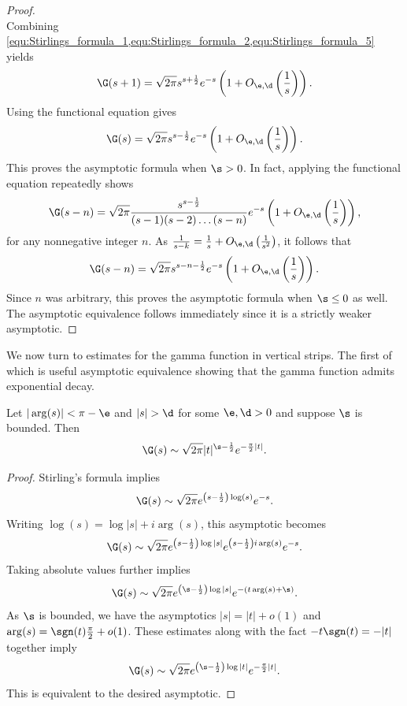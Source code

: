 \documentclass[12pt]{article}
\begin{document}
\begin{proof}
\begin{equation}
      \end{equation}
      Combining \cref{equ:Stirlings_formula_1,equ:Stirlings_formula_2,equ:Stirlings_formula_5} yields
      \[
        \G(s+1) = \sqrt{2\pi}s^{s+\frac{1}{2}}e^{-s}\left(1+O_{\e,\d}\left(\frac{1}{s}\right)\right).
      \]
      Using the functional equation gives
      \[
        \G(s) = \sqrt{2\pi}s^{s-\frac{1}{2}}e^{-s}\left(1+O_{\e,\d}\left(\frac{1}{s}\right)\right).
      \]
      This proves the asymptotic formula when \(\s > 0\). In fact, applying the functional equation repeatedly shows
      \[
        \G(s-n) = \sqrt{2\pi}\frac{s^{s-\frac{1}{2}}}{(s-1)(s-2) \ldots (s-n)}e^{-s}\left(1+O_{\e,\d}\left(\frac{1}{s}\right)\right),
      \]
      for any nonnegative integer \(n\). As \(\frac{1}{s-k} = \frac{1}{s}+O_{\e,\d}\left(\frac{1}{s^{2}}\right)\), it follows that
      \[
        \G(s-n) = \sqrt{2\pi}s^{s-n-\frac{1}{2}}e^{-s}\left(1+O_{\e,\d}\left(\frac{1}{s}\right)\right).
      \]
      Since \(n\) was arbitrary, this proves the asymptotic formula when \(\s \le 0\) as well. The asymptotic equivalence follows immediately since it is a strictly weaker asymptotic.
    \end{proof}

    We now turn to estimates for the gamma function in vertical strips. The first of which is useful asymptotic equivalence showing that the gamma function admits exponential decay.
    
    \begin{corollary}\label{equ:weaker_Stirling_formula_1}
      Let \(|\arg(s)| < \pi-\e\) and \(|s| > \d\) for some \(\e,\d > 0\) and suppose \(\s\) is bounded. Then
      \[
        \G(s) \sim \sqrt{2\pi}|t|^{\s-\frac{1}{2}}e^{-\frac{\pi}{2}|t|}.
      \]
    \end{corollary}
    \begin{proof}
      Stirling's formula implies
      \[
        \G(s) \sim \sqrt{2\pi}e^{\left(s-\frac{1}{2}\right)\log(s)}e^{-s}.
      \]
      Writing \(\log(s) = \log|s|+i\arg(s)\), this asymptotic becomes
      \[
        \G(s) \sim \sqrt{2\pi}e^{\left(s-\frac{1}{2}\right)\log|s|}e^{\left(s-\frac{1}{2}\right)i\arg(s)}e^{-s}.
      \]
      Taking absolute values further implies
      \[
        \G(s) \sim \sqrt{2\pi}e^{\left(\s-\frac{1}{2}\right)\log|s|}e^{-(t\arg(s)+\s)}.
      \]
      As \(\s\) is bounded, we have the asymptotics \(|s| = |t|+o(1)\) and \(\arg(s) = \sgn(t)\frac{\pi}{2}+o(1)\). These estimates along with the fact \(-t\sgn(t) = -|t|\) together imply
      \[
        \G(s) \sim \sqrt{2\pi}e^{\left(\s-\frac{1}{2}\right)\log|t|}e^{-\frac{\pi}{2}|t|}.
      \]
      This is equivalent to the desired asymptotic.
    \end{proof}
\end{document}
